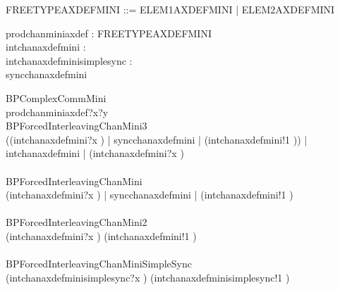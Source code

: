 \begin{zed}
   FREETYPEAXDEFMINI ::= ELEM1AXDEFMINI | ELEM2AXDEFMINI
\end{zed}

\begin{circus}
  \circchannel prodchanminiaxdef : \nat \cross FREETYPEAXDEFMINI \\
  \circchannel intchanaxdefmini : \nat \\
  \circchannel intchanaxdefminisimplesync : \nat \\
  \circchannel syncchanaxdefmini \\
\end{circus}

\begin{circus}
 \circprocess BPComplexCommMini \circdef \circbegin \\
    \circspot prodchanminiaxdef?x?y \then \Skip%
 \circend \\

 \circprocess BPForcedInterleavingChanMini3 \circdef \circbegin \\
    \circspot 
      ((intchanaxdefmini?x \then \Skip) \lpar | \lchanset syncchanaxdefmini \rchanset | \rpar (intchanaxdefmini!1 \then \Skip))
      \lpar | \lchanset intchanaxdefmini \rchanset | \rpar (intchanaxdefmini?x \then \Skip)
    \\
 \circend \\

 \circprocess BPForcedInterleavingChanMini \circdef \circbegin \\
    \circspot (intchanaxdefmini?x \then \Skip) \lpar | \lchanset syncchanaxdefmini \rchanset | \rpar (intchanaxdefmini!1 \then \Skip) \\
 \circend \\

 \circprocess BPForcedInterleavingChanMini2 \circdef \circbegin \\
    \circspot (intchanaxdefmini?x \then \Skip) \interleave (intchanaxdefmini!1 \then \Skip) \\
 \circend \\

 \circprocess BPForcedInterleavingChanMiniSimpleSync \circdef \circbegin \\
    \circspot (intchanaxdefminisimplesync?x \then \Skip) \interleave (intchanaxdefminisimplesync!1 \then \Skip) \\
 \circend \\

 \end{circus}


